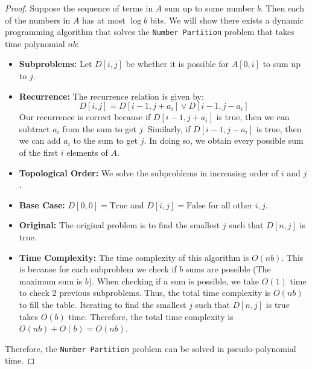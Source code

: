 \documentclass[11pt]{scrartcl}
\theoremstyle{dotlessP}
\theoremstyle{dotlessN}
\theoremstyle{dotN}
\begin{document}
\begin{proof}
   Suppose the sequence of terms in $A$ sum up to some number  $b$. Then each of the numbers in  $A$ has at most  $\log
   b$ bits. We will show there exists a dynamic programming algorithm that solves the \texttt{Number Partition} problem
   that takes time polynomial $nb$:
   \begin{itemize}
       \item \textbf{Subproblems:} Let $D[i,j]$ be whether it is possible for  $A[0,i]$ to sum up to $j$.
   
  \item \textbf{Recurrence:} The recurrence relation is given by:
    \[
   D[i,j] = D[i-1,j+a_i] \lor D[i-1,j-a_i]
   \] 
    Our recurrence is correct because if $D[i-1,j+a_i]$ is true, then we can subtract $a_i$ from the sum to get $j$.
    Similarly, if $D[i-1,j-a_i]$ is true, then we can add $a_i$ to the sum to get $j$. In doing so, we obtain every
    possible sum of the first $i$ elements of $A$.

   \item\textbf{Topological Order:} We solve the subproblems in increasing order of $i$ and $j$.

    \item\textbf{Base Case:} $D[0,0] = \text{True}$ and $D[i,j] = \text{False}$ for all other $i,j$.

    \item\textbf{Original:} The original problem is to find the smallest $j$ such that $D[n,j]$ is true.

   \item \textbf{Time Complexity:} The time complexity of this algorithm is $O(nb)$. This is because for each
    subproblem we check if $b$ sums are possible (The maximum sum is $b$). When checking if a sum is possible, we
    take  $O(1)$ time to check 2 previous subproblems. Thus, the total time complexity is $O(nb)$ to fill the
    table. Iterating to find the smallest $j$ such that $D[n,j]$ is true takes $O(b)$ time. Therefore, the total time
    complexity is $O(nb) + O(b) = O(nb)$.
   \end{itemize}
    Therefore, the \texttt{Number Partition} problem can be solved in pseudo-polynomial time.
\end{proof}
\end{document}
